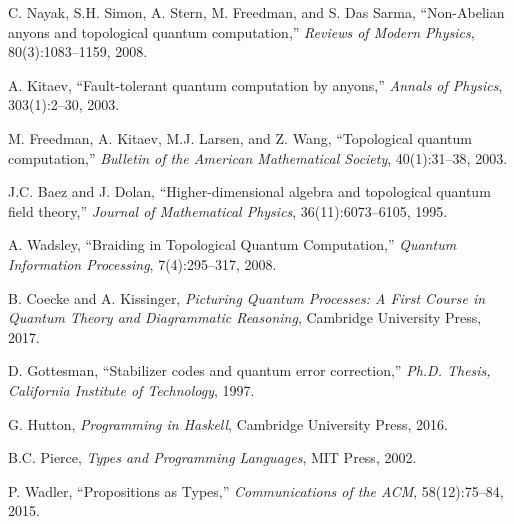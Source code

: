 \documentclass[12pt]{article}
\begin{document}
\begin{thebibliography}{99}

C. Nayak, S.H. Simon, A. Stern, M. Freedman, and S. Das Sarma,
\newblock ``Non-Abelian anyons and topological quantum computation,''
\newblock \emph{Reviews of Modern Physics}, 80(3):1083--1159, 2008.

A. Kitaev,
\newblock ``Fault-tolerant quantum computation by anyons,''
\newblock \emph{Annals of Physics}, 303(1):2--30, 2003.

M. Freedman, A. Kitaev, M.J. Larsen, and Z. Wang,
\newblock ``Topological quantum computation,''
\newblock \emph{Bulletin of the American Mathematical Society}, 40(1):31--38, 2003.

J.C. Baez and J. Dolan,
\newblock ``Higher-dimensional algebra and topological quantum field theory,''
\newblock \emph{Journal of Mathematical Physics}, 36(11):6073--6105, 1995.

A. Wadsley,
\newblock ``Braiding in Topological Quantum Computation,''
\newblock \emph{Quantum Information Processing}, 7(4):295--317, 2008.

B. Coecke and A. Kissinger,
\newblock \emph{Picturing Quantum Processes: A First Course in Quantum Theory and Diagrammatic Reasoning},
\newblock Cambridge University Press, 2017.

D. Gottesman,
\newblock ``Stabilizer codes and quantum error correction,''
\newblock \emph{Ph.D. Thesis, California Institute of Technology}, 1997.

G. Hutton,
\newblock \emph{Programming in Haskell},
\newblock Cambridge University Press, 2016.

B.C. Pierce,
\newblock \emph{Types and Programming Languages},
\newblock MIT Press, 2002.

P. Wadler,
\newblock ``Propositions as Types,''
\newblock \emph{Communications of the ACM}, 58(12):75--84, 2015.

\end{thebibliography}
\end{document}
